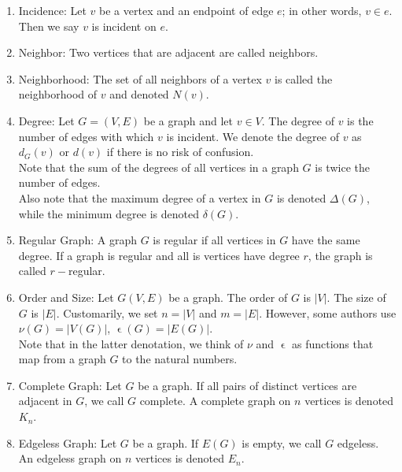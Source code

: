 \documentclass{article}
\begin{document}
\begin{enumerate}
    \item Incidence: Let $v$ be a vertex and an endpoint of edge $e$; in other words, $v\in e$.
    Then we say $v$ is incident on $e$.
    
    \item Neighbor: Two vertices that are adjacent are called neighbors.
    
    \item Neighborhood: The set of all neighbors of a vertex $v$ is called the neighborhood of $v$ and denoted $N(v)$.
    
    \item Degree: Let $G=(V,E)$ be a graph and let $v\in V$.
    The degree of $v$ is the number of edges with which $v$ is incident.
    We denote the degree of $v$ as $d_G(v)$ or $d(v)$ if there is no risk of confusion.\\
    
    Note that the sum of the degrees of all vertices in a graph $G$ is twice the number of edges.\\
    
    Also note that the maximum degree of a vertex in $G$ is denoted $\Delta(G)$, while the minimum degree is denoted $\delta(G)$.
    
    \item Regular Graph: A graph $G$ is regular if all vertices in $G$ have the same degree.
    If a graph is regular and all is vertices have degree $r$, the graph is called $r-$regular.
    
    \item Order and Size: Let $G(V,E)$ be a graph.
    The order of $G$ is $|V|$.
    The size of $G$ is $|E|$.
    Customarily, we set $n=|V|$ and $m=|E|$.
    However, some authors use $\nu(G)=|V(G)|$, $\upvarepsilon(G)=|E(G)|$.\\
    
    Note that in the latter denotation, we think of $\nu$ and $\upvarepsilon$ as functions that map from a graph $G$ to the natural numbers.

    \item Complete Graph: Let $G$ be a graph.
    If all pairs of distinct vertices are adjacent in $G$, we call $G$ complete.
    A complete graph on $n$ vertices is denoted $K_n$.
    
    \item Edgeless Graph: Let $G$ be a graph.
    If $E(G)$ is empty, we call $G$ edgeless.
    An edgeless graph on $n$ vertices is denoted $E_n$.
    

\end{enumerate}
\end{document}
